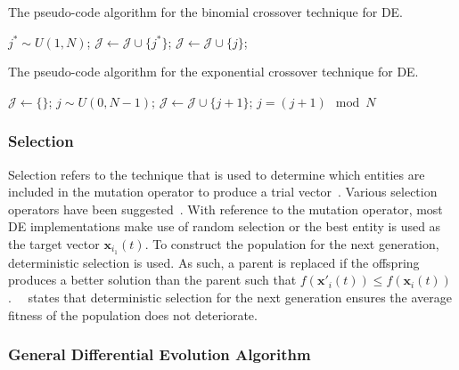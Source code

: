 {\begin{algorithm}[htb]
	\caption{The pseudo-code algorithm for the binomial crossover technique for \acs{DE}.}
	\label{algo:heuristics:de:bin}
	\begin{algorithmic}
		\State $j^{*} \sim U(1,N)$;
		\State $\mathcal{J} \gets \mathcal{J} \cup \{j^{*}\}$;
		\State $\mathcal{J} \gets \mathcal{J} \cup \{j\}$;
		\EndIf
		\EndFor
	\end{algorithmic}
\end{algorithm}

\begin{algorithm}[htb]
	\caption{The pseudo-code algorithm for the exponential crossover technique for \acs{DE}.}
	\label{algo:heuristics:de:exp}
	\begin{algorithmic}
		\State $\mathcal{J} \gets \{\}$;
		\State $j \sim U(0,N - 1)$;
		\Repeat
		\State $\mathcal{J} \gets \mathcal{J} \cup \{j + 1 \}$;
		\State $j = (j+1) \mod N$
		\Until{ $U(0,1) \geq p_{r}$ or $|\mathcal{J}| = N$;}
	\end{algorithmic}
\end{algorithm}

\subsubsection{Selection}\label{sec:heuristics:mh:de:selection}

Selection refers to the technique that is used to determine which entities are included in the mutation operator to produce a trial vector~\cite{ref:engelbrecht:2007}. Various selection operators have been suggested~\cite{ref:storn:1996, ref:storn:1997}. With reference to the mutation operator, most \acs{DE} implementations make use of random selection or the best entity is used as the target vector $\boldsymbol{x}_{i_{1}}(t)$. To construct the population for the next generation, deterministic selection is used. As such, a parent is replaced if the offspring produces a better solution than the parent such that $f(\boldsymbol{x}'_{i}(t)) \leq f(\boldsymbol{x}_{i}(t))$.~\citeauthor{ref:engelbrecht:2007}~\cite{ref:engelbrecht:2007} states that deterministic selection for the next generation ensures the average fitness of the population does not deteriorate.


\subsubsection{General Differential Evolution Algorithm}

}

